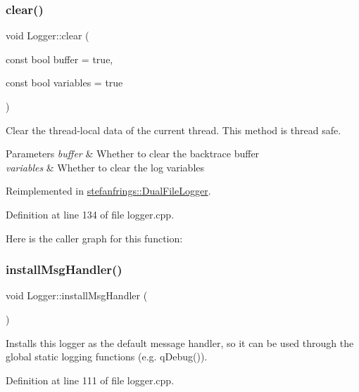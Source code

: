 \subsubsection{\texorpdfstring{clear()}{clear()}}
{\footnotesize\ttfamily void Logger\+::clear (\begin{DoxyParamCaption}\item[{const bool}]{buffer = {\ttfamily true},  }\item[{const bool}]{variables = {\ttfamily true} }\end{DoxyParamCaption})\hspace{0.3cm}{\ttfamily [virtual]}}

Clear the thread-\/local data of the current thread. This method is thread safe. 
\begin{DoxyParams}{Parameters}
{\em buffer} & Whether to clear the backtrace buffer \\
\hline
{\em variables} & Whether to clear the log variables \\
\hline
\end{DoxyParams}


Reimplemented in \mbox{\hyperlink{classstefanfrings_1_1_dual_file_logger_a4af0d2c35121b1f40dbd08b053a53ddf}{stefanfrings\+::\+Dual\+File\+Logger}}.



Definition at line 134 of file logger.\+cpp.

Here is the caller graph for this function\+:
\mbox{\label{classstefanfrings_1_1_logger_a333125f7ac75da148f3345ad4e5c49f3}} 
\subsubsection{\texorpdfstring{install\+Msg\+Handler()}{installMsgHandler()}}
{\footnotesize\ttfamily void Logger\+::install\+Msg\+Handler (\begin{DoxyParamCaption}{ }\end{DoxyParamCaption})}

Installs this logger as the default message handler, so it can be used through the global static logging functions (e.\+g. q\+Debug()). 

Definition at line 111 of file logger.\+cpp.

